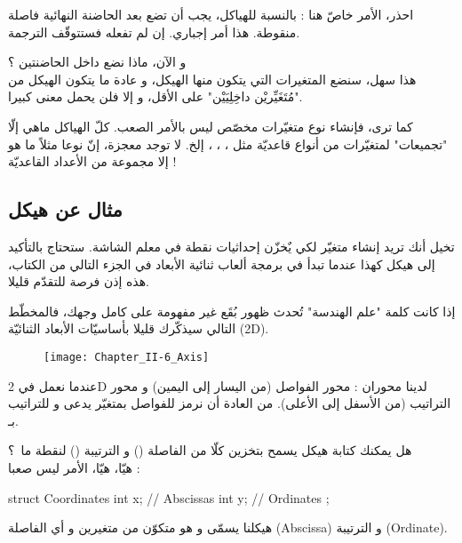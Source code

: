 \begin{critical}
  احذر، الأمر خاصّ هنا : بالنسبة للهياكل، يجب أن تضع بعد الحاضنة النهائية فاصلة منقوطة. هذا أمر إجباري. إن لم تفعله فستتوقّف الترجمة.
\end{critical}

و الآن، ماذا نضع داخل الحاضنتين ؟\\
هذا سهل، سنضع المتغيرات التي يتكون منها الهيكل، و عادة ما يتكون الهيكل من "مُتَغَيِّريْن داخِلِيَيْن" على الأقل، و إلا فلن يحمل معنى كبيرا.

كما ترى، فإنشاء نوع متغيّرات مخصّص ليس بالأمر الصعب. كلّ الهياكل ماهي إلّا "تجميعات" لمتغيّرات من أنواع قاعديّة مثل
، ، ،
إلخ. لا توجد معجزة، إنّ نوعا
مثلاً ما هو إلا مجموعة من الأعداد القاعديّة !

\subsection{مثال عن هيكل}

تخيل أنك تريد إنشاء متغيّر لكي يٌخزّن إحداثيات نقطة في معلم الشاشة. ستحتاج بالتأكيد إلى هيكل كهذا عندما تبدأ في برمجة ألعاب ثنائية الأبعاد في الجزء التالي من الكتاب، هذه إذن فرصة للتقدّم قليلا.

إذا كانت كلمة "علم الهندسة" تُحدث ظهور بُقَع غير مفهومة على كامل وجهك، فالمخطّط التالي سيذكّرك قليلا بأساسيّات الأبعاد الثنائيّة (\textenglish{2D}).

\begin{figure}[H]
	\centering
	\texttt{[image: Chapter\_II-6\_Axis]}
\end{figure}

عندما نعمل في
\textenglish{2D}
لدينا محوران : محور الفواصل (من اليسار إلى اليمين) و محور التراتيب (من الأسفل إلى الأعلى). من العادة أن نرمز للفواصل بمتغيّر يدعى
و للتراتيب بـ.

هل يمكنك كتابة هيكل
يسمح بتخزين كلّا من الفاصلة
()
و الترتيبة
()
لنقطة ما~؟\\
هيّا، هيّا، الأمر ليس صعبا :

\begin{Csource}
struct Coordinates
{
	int x; // Abscissas
	int y; // Ordinates
};
\end{Csource}

هيكلنا يسمّى
و هو متكوّن من متغيرين
و
أي الفاصلة
(\textenglish{Abscissa})
و الترتيبة
(\textenglish{Ordinate}).


